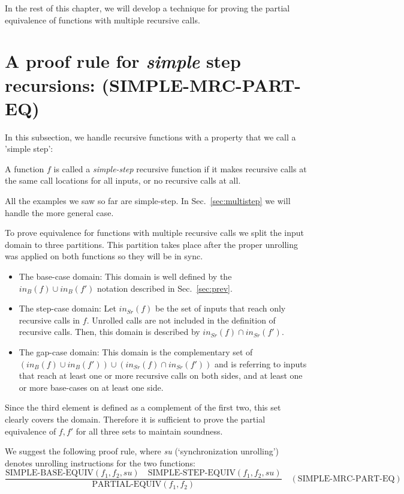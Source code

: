 In the rest of this chapter, we will develop a technique for proving the partial equivalence of functions with multiple recursive calls.

\section{A proof rule for \emph{simple} step recursions: (SIMPLE-MRC-PART-EQ) }
\label{sec:adaptstep}
In this subsection, we handle recursive functions with a property that we call a 'simple step': 
\begin{definition} \label{def:simple}
A function $f$ is called a \emph{simple-step} recursive function if it makes recursive calls at the same call locations for all inputs, or no recursive calls at all.
\end{definition}
All the examples we saw so far are simple-step. In Sec.~\ref{sec:multistep} we will handle the more general case. 

To prove equivalence for functions with multiple recursive calls we split the input domain to three partitions. This partition takes place after the proper unrolling was applied on both functions so they will be in sync.
\begin{itemize}
    \item The base-case domain: This domain is well defined by the $in_B(f) \cup in_B(f')$ notation described in Sec.~\ref{sec:prev}.
    \item The step-case domain: Let $in_{Sr}(f)$ be the set of inputs that reach only recursive calls in $f$. Unrolled calls are not included in the definition of recursive calls. Then, this domain is described by $in_{Sr}(f) \cap in_{Sr}(f')$.
    \item The gap-case domain: This domain is the complementary set of $(in_B(f) \cup in_B(f')) \cup (in_{Sr}(f) \cap in_{Sr}(f'))$ and is referring to inputs that reach at least one or more recursive calls on both sides, and at least one or more base-cases on at least one side.
\end{itemize}
Since the third element is defined as a complement of the first two, this set clearly covers the domain. Therefore it is sufficient to prove the partial equivalence of $f,f'$ for all three sets to maintain soundness. 

We suggest the following proof rule, where  \emph{su} (`synchronization unrolling') denotes unrolling instructions for the two functions:
\begin{equation}
 {\frac {\text{SIMPLE-BASE-EQUIV}(f_1,f_2,su) \quad \text{SIMPLE-STEP-EQUIV}(f_1,f_2,su)}{\text{PARTIAL-EQUIV}(f_1,f_2)}} 
  \quad (\text{SIMPLE-MRC-PART-EQ})
\end{equation}

